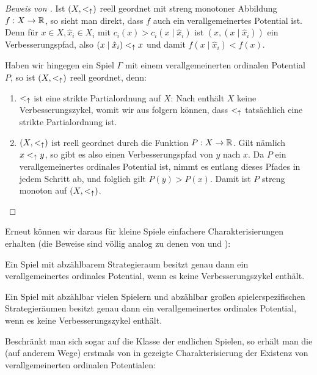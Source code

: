 \begin{proof}[Beweis von ]
	Ist $(X, <_\uparrow)$ reell geordnet mit streng monotoner Abbildung $f: X \to \mathbb{R}$, so sieht man direkt, dass $f$ auch ein verallgemeinertes Potential ist. Denn für $x \in X, \hat{x}_i \in X_i$ mit $c_i(x) > c_i(x \mid \hat{x}_i)$ ist $(x, (x \mid \hat{x}_i))$ ein Verbesserungspfad, also $(x \mid \hat{x}_i) <_\uparrow x$ und damit $f(x \mid \hat{x}_i) < f(x)$.
	
	Haben wir hingegen ein Spiel $\Gamma$ mit einem verallgemeinerten ordinalen Potential $P$, so ist $(X, <_\uparrow)$ reell geordnet, denn:
	\begin{enumerate}
		\item $<_\uparrow$ ist eine strikte Partialordnung auf $X$: Nach  enthält $X$ keine Verbesserungszykel, womit wir aus  folgern können, dass $<_\uparrow$ tatsächlich eine strikte Partialordnung ist.
		\item $(X, <_\uparrow)$ ist reell geordnet durch die Funktion $P: X \to \mathbb{R}$. Gilt nämlich $x <_\uparrow y$, so gibt es also einen Verbesserungspfad von $y$ nach $x$. Da $P$ ein verallgemeinertes ordinales Potential ist, nimmt es entlang dieses Pfades in jedem Schritt ab, und folglich gilt $P(y) > P(x)$. Damit ist $P$ streng monoton auf $(X, <_\uparrow)$. \qedhere
	\end{enumerate} 
\end{proof}

Erneut können wir daraus für \glqq kleine\grqq{} Spiele einfachere Charakterisierungen erhalten (die Beweise sind völlig analog zu denen von  und ):

\begin{kor}\label{kor:CharExVerOrdPotabzX}
	Ein Spiel mit abzählbarem Strategieraum besitzt genau dann ein verallgemeinertes ordinales Potential, wenn es keine Verbesserungszykel enthält.
\end{kor}

\begin{kor}\label{kor:CharExVerOrdPotabzIundXi}
	Ein Spiel mit abzählbar vielen Spielern und abzählbar großen spielerspezifischen Strategieräumen besitzt genau dann ein verallgemeinertes ordinales Potential, wenn es keine Verbesserungszykel enthält.
\end{kor}

Beschränkt man sich sogar auf die Klasse der endlichen Spielen, so erhält man die (auf anderem Wege) erstmals von \citeauthor{MonShap} in \cite[Lemma 2.5]{MonShap} gezeigte Charakterisierung der Existenz von verallgemeinerten ordinalen Potentialen:

